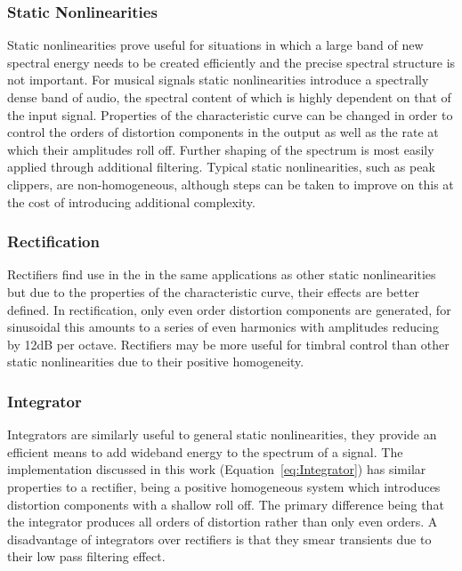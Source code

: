 		\subsubsection*{Static Nonlinearities}
			Static nonlinearities prove useful for situations in which a large band of new spectral energy
			needs to be created efficiently and the precise spectral structure is not important. For musical
			signals static nonlinearities introduce a spectrally dense band of audio, the spectral content of
			which is highly dependent on that of the input signal. Properties of the characteristic curve can
			be changed in order to control the orders of distortion components in the output as well as the
			rate at which their amplitudes roll off. Further shaping of the spectrum is most easily applied
			through additional filtering. Typical static nonlinearities, such as peak clippers, are
			non-homogeneous, although steps can be taken to improve on this at the cost of introducing
			additional complexity.
			
		\subsubsection*{Rectification}
			Rectifiers find use in the in the same applications as other static nonlinearities but due to the
			properties of the characteristic curve, their effects are better defined. In rectification, only
			even order distortion components are generated, for sinusoidal this amounts to a series of even
			harmonics with amplitudes reducing by 12dB per octave. Rectifiers may be more useful for timbral
			control than other static nonlinearities due to their positive homogeneity.

		\subsubsection*{Integrator}
			Integrators are similarly useful to general static nonlinearities, they provide an efficient means
			to add wideband energy to the spectrum of a signal. The implementation discussed in this work
			(Equation~\ref{eq:Integrator}) has similar properties to a rectifier, being a positive homogeneous
			system which introduces distortion components with a shallow roll off. The primary difference being
			that the integrator produces all orders of distortion rather than only even orders. A disadvantage
			of integrators over rectifiers is that they smear transients due to their low pass filtering
			effect.

